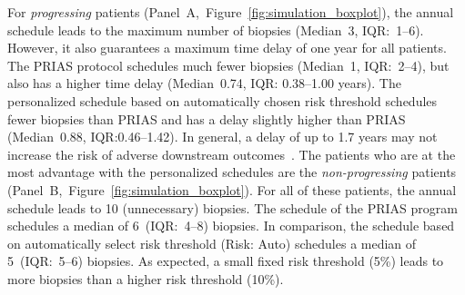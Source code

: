 For \textit{progressing} patients (Panel~A,~Figure~\ref{fig:simulation_boxplot}), the annual schedule leads to the maximum number of biopsies (Median~3, IQR:~1--6). However, it also guarantees a maximum time delay of one year for all patients. The PRIAS protocol schedules much fewer biopsies (Median~1, IQR:~2--4), but also has a higher time delay (Median~0.74, IQR: 0.38--1.00 years). The personalized schedule based on automatically chosen risk threshold schedules fewer biopsies than PRIAS and has a delay slightly higher than PRIAS (Median~0.88, IQR:0.46--1.42). In general, a delay of up to 1.7 years may not increase the risk of adverse downstream outcomes~\citep{inoue2018comparative,carvalho}. The patients who are at the most advantage with the personalized schedules are the \textit{non-progressing} patients (Panel~B,~Figure~\ref{fig:simulation_boxplot}). For all of these patients, the annual schedule leads to 10 (unnecessary) biopsies. The schedule of the PRIAS program schedules a median of 6~(IQR:~4--8) biopsies. In comparison, the schedule based on automatically select risk threshold (Risk: Auto) schedules a median of 5~(IQR:~5--6) biopsies. As expected, a small fixed risk threshold (5\%) leads to more biopsies than a higher risk threshold (10\%).

